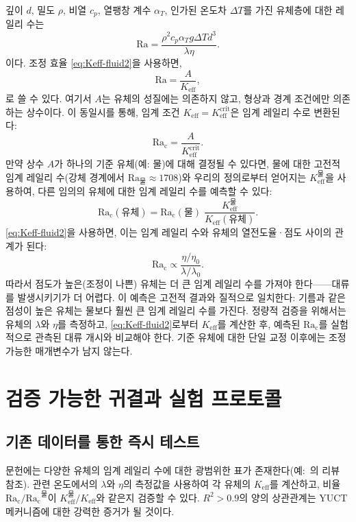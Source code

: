 \documentclass[12pt,a4paper]{article}
\begin{document}
	깊이 \(d\), 밀도 \(\rho\), 비열 \(c_p\), 열팽창 계수 \(\alpha_T\), 인가된 온도차 \(\Delta T\)를 가진 유체층에 대한 레일리 수는
	\begin{equation}
		\mathrm{Ra} = \frac{\rho^2 c_p \alpha_T g \Delta T d^3}{\lambda \eta}.
	\end{equation}
	이다. 조정 효율 \eqref{eq:Keff-fluid2}을 사용하면,
	\begin{equation}
		\mathrm{Ra} = \frac{A}{K_{\mathrm{eff}}},
	\end{equation}
	로 쓸 수 있다. 여기서 \(A\)는 유체의 성질에는 의존하지 않고, 형상과 경계 조건에만 의존하는 상수이다. 이 동일시를 통해, 임계 조건 \(K_{\mathrm{eff}} = K_{\mathrm{eff}}^{\mathrm{crit}}\)은 임계 레일리 수로 변환된다:
	\begin{equation}\label{eq:Racrit}
		\mathrm{Ra_c} = \frac{A}{K_{\mathrm{eff}}^{\mathrm{crit}}}.
	\end{equation}
	만약 상수 \(A\)가 하나의 기준 유체(예: 물)에 대해 결정될 수 있다면, 물에 대한 고전적 임계 레일리 수(강체 경계에서 \(\mathrm{Ra}_{\text{물}} \approx 1708\))와 우리의 정의로부터 얻어지는 \(K_{\mathrm{eff}}^{\text{물}}\)을 사용하여, 다른 임의의 유체에 대한 임계 레일리 수를 예측할 수 있다:
	\begin{equation}\label{eq:Racrit-predict}
		\boxed{ \mathrm{Ra_c}(\text{유체}) = \mathrm{Ra_c}(\text{물}) \;
			\frac{K_{\mathrm{eff}}^{\text{물}}}{K_{\mathrm{eff}}(\text{유체})} }.
	\end{equation}
	\eqref{eq:Keff-fluid2}을 사용하면, 이는 임계 레일리 수와 유체의 열전도율·점도 사이의 관계가 된다:
	\begin{equation}
		\mathrm{Ra_c} \propto \frac{\eta / \eta_0}{\lambda / \lambda_0}.
	\end{equation}
	따라서 점도가 높은(조정이 나쁜) 유체는 더 큰 임계 레일리 수를 가져야 한다——대류를 발생시키기가 더 어렵다. 이 예측은 고전적 결과와 질적으로 일치한다: 기름과 같은 점성이 높은 유체는 물보다 훨씬 큰 임계 레일리 수를 가진다. 정량적 검증을 위해서는 유체의 \(\lambda\)와 \(\eta\)를 측정하고, \eqref{eq:Keff-fluid2}로부터 \(K_{\mathrm{eff}}\)를 계산한 후, 예측된 \(\mathrm{Ra_c}\)를 실험적으로 관측된 대류 개시와 비교해야 한다. 기준 유체에 대한 단일 교정 이후에는 조정 가능한 매개변수가 남지 않는다.
	
	\section{검증 가능한 귀결과 실험 프로토콜}
	
	\subsection{기존 데이터를 통한 즉시 테스트}
	문헌에는 다양한 유체의 임계 레일리 수에 대한 광범위한 표가 존재한다(예:~\cite{Chandrasekhar1961, Cross1993}의 리뷰 참조). 관련 온도에서의 \(\lambda\)와 \(\eta\)의 측정값을 사용하여 각 유체의 \(K_{\mathrm{eff}}\)를 계산하고, 비율 \(\mathrm{Ra_c}/\mathrm{Ra_c}^{\text{물}}\)이 \(K_{\mathrm{eff}}^{\text{물}} / K_{\mathrm{eff}}\)와 같은지 검증할 수 있다. \(R^2 > 0.9\)의 양의 상관관계는 YUCT 메커니즘에 대한 강력한 증거가 될 것이다.
	
\end{document}
